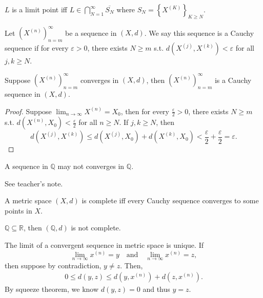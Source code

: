\begin{proposition}
    \(L\) is a limit point iff \(L \in \bigcap_{N=1}^{\infty} \overline{S_N}  \) where \(S_N  = \left\{ X^{(K)} \right\}_{K \ge N} \). 
\end{proposition}

\begin{definition}
    Let \(\left( X^{(n)} \right)_{n=m}^{\infty}  \) be a sequence in \((X, d)\). We say this sequence is a Cauchy sequence if for every \(\varepsilon > 0\), there exists \(N \ge m\) s.t. \(d\left( X^{(j)}, X^{(k)} \right) < \varepsilon  \) for all \(j, k \ge N\).      
\end{definition}

\begin{lemma} \label{lm: converge equal Cauchy}
    Suppose \(\left( X^{(n)} \right)_{n=m}^{\infty}  \) converges in \((X, d)\), then \(\left( X^{(n)} \right)_{n=m}^{\infty}  \) is a Cauchy sequence in \((X, d)\).  
\end{lemma}
\begin{proof}
    Suppose \(\lim_{n \to \infty} X^{(n)} = X_0\), then for every \(\frac{\varepsilon}{2} > 0\), there exists \(N \ge m\) s.t. \(d\left( X^{(n)}, X_0 \right) < \frac{\varepsilon}{2}\) for all \(n \ge N\). If \(j, k \ge N\), then 
    \[
        d\left( X^{(j)}, X^{(k)} \right) \le d\left( X^{(j)}, X_0 \right) + d\left( X^{(k)}, X_0 \right) <\frac{\varepsilon}{2} + \frac{\varepsilon}{2} = \varepsilon.   
    \]      
\end{proof}

\begin{eg}
A sequence in \(\mathbb{Q} \) may not converges in \(\mathbb{Q} \).  
\end{eg}
\begin{explanation}
    See teacher's note.
\end{explanation}

\begin{definition} \label{def: complete}
    A metric space \((X, d)\) is complete iff every Cauchy sequence converges to some points in \(X\). 
\end{definition}

\begin{remark}
    \( \mathbb{Q} \subseteq \mathbb{R} \), then \((\mathbb{Q} ,d)\) is not complete. 
\end{remark}

\begin{remark}
    The limit of a convergent sequence in metric space is unique. If 
    \[
        \lim_{n \to \infty} x^{(n)} = y \quad \text{and} \quad \lim_{n \to \infty} x^{(n)} = z,
    \] then suppose by contradiction, \(y \neq z\). Then, 
    \begin{align*}
        0 \le d(y, z) \le d\left( y, x^{(n)} \right) + d\left( z, x^{(n)} \right) .
    \end{align*} 
    By squeeze theorem, we know \(d(y, z) = 0\) and thus \(y = z\).  
\end{remark}

